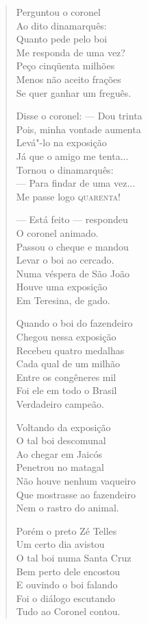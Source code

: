 \begin{verse}
Perguntou o coronel \\
Ao dito dinamarquês: \\
Quanto pede pelo boi \\
Me responda de uma vez? \\
Peço cinqüenta milhões \\
Menos não aceito frações \\
Se quer ganhar um freguês. 
\pagebreak

Disse o coronel: ---  Dou trinta \\
Pois, minha vontade aumenta \\
Levá"-lo na exposição \\
Já que o amigo me tenta... \\
Tornou o dinamarquês: \\
---  Para findar de uma vez... \\
Me passe logo \textsc{quarenta}! 

---  Está feito ---  respondeu \\
O coronel animado. \\
Passou o cheque e mandou \\
Levar o boi ao cercado. \\
Numa véspera de São João \\
Houve uma exposição \\
Em Teresina, de gado. 

Quando o boi do fazendeiro \\
Chegou nessa exposição \\
Recebeu quatro medalhas \\
Cada qual de um milhão \\
Entre os congêneres mil \\
Foi ele em todo o Brasil \\
Verdadeiro campeão. 

Voltando da exposição \\
O tal boi descomunal \\
Ao chegar em Jaicós \\
Penetrou no matagal \\
Não houve nenhum vaqueiro \\
Que mostrasse ao fazendeiro \\
Nem o rastro do animal. 
\pagebreak

Porém o preto Zé Telles \\
Um certo dia avistou \\
O tal boi numa Santa Cruz \\
Bem perto dele encostou \\
E ouvindo o boi falando \\
Foi o diálogo escutando \\
Tudo ao Coronel contou. 


\end{verse}
